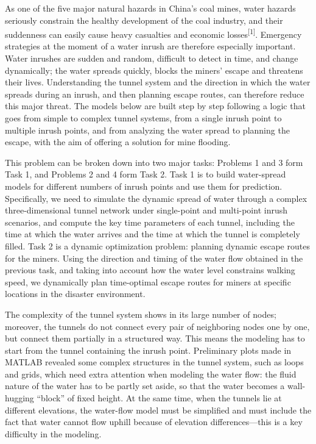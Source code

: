 \documentclass[12pt,a4paper]{article}
\makeatletter
\renewcommand{\section}{\@startsection{section}{1}{\z@}{2.5ex \@plus 1ex}{1.5ex}{\centering\Large\bfseries}}
\makeatother
\begin{document}
As one of the five major natural hazards in China's coal mines, water hazards seriously constrain the healthy development of the coal industry, and their suddenness can easily cause heavy casualties and economic losses\textsuperscript{[1]}. Emergency strategies at the moment of a water inrush are therefore especially important. Water inrushes are sudden and random, difficult to detect in time, and change dynamically; the water spreads quickly, blocks the miners' escape and threatens their lives. Understanding the tunnel system and the direction in which the water spreads during an inrush, and then planning escape routes, can therefore reduce this major threat. The models below are built step by step following a logic that goes from simple to complex tunnel systems, from a single inrush point to multiple inrush points, and from analyzing the water spread to planning the escape, with the aim of offering a solution for mine flooding.

\section{Problem Restatement and Analysis}

This problem can be broken down into two major tasks: Problems 1 and 3 form Task 1, and Problems 2 and 4 form Task 2. Task 1 is to build water-spread models for different numbers of inrush points and use them for prediction. Specifically, we need to simulate the dynamic spread of water through a complex three-dimensional tunnel network under single-point and multi-point inrush scenarios, and compute the key time parameters of each tunnel, including the time at which the water arrives and the time at which the tunnel is completely filled. Task 2 is a dynamic optimization problem: planning dynamic escape routes for the miners. Using the direction and timing of the water flow obtained in the previous task, and taking into account how the water level constrains walking speed, we dynamically plan time-optimal escape routes for miners at specific locations in the disaster environment.

The complexity of the tunnel system shows in its large number of nodes; moreover, the tunnels do not connect every pair of neighboring nodes one by one, but connect them partially in a structured way. This means the modeling has to start from the tunnel containing the inrush point. Preliminary plots made in MATLAB revealed some complex structures in the tunnel system, such as loops and grids, which need extra attention when modeling the water flow: the fluid nature of the water has to be partly set aside, so that the water becomes a wall-hugging ``block'' of fixed height. At the same time, when the tunnels lie at different elevations, the water-flow model must be simplified and must include the fact that water cannot flow uphill because of elevation differences---this is a key difficulty in the modeling.
\end{document}
